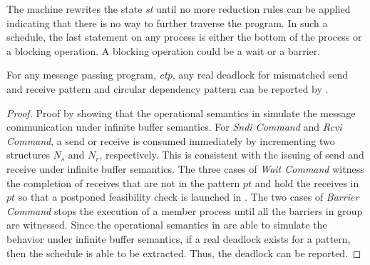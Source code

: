 The machine rewrites the state \textit{st} until no more reduction rules can be applied indicating that there is no way to further traverse the program. In such a schedule, the last statement on any process is either the bottom of the process or a blocking operation. A blocking operation could be a wait or a barrier. 



\begin{lemma}
For any message passing program, \textit{ctp}, any real deadlock for mismatched send and receive pattern and circular dependency pattern can be reported by .
\label{lemma:complete}
\end{lemma}
\begin{proof}
Proof by showing that the operational semantics in  simulate the message communication under infinite buffer semantics. For \emph{Sndi Command} and \emph{Rcvi Command}, a send or receive is consumed immediately by incrementing two structures $\mathit{N_s}$ and $\mathit{N_r}$, respectively. This is consistent with the issuing of send and receive under infinite buffer semantics. The three cases of \emph{Wait Command} witness the completion of receives that are not in the pattern $\mathit{pt}$ and hold the receives in $\mathit{pt}$ so that a postponed feasibility check is launched in . The two cases of \emph{Barrier Command} stops the execution of a member process until all the barriers in group are witnessed. Since the operational semantics in  are able to simulate the behavior under infinite buffer semantics, if a real deadlock exists for a pattern, then the schedule is able to be extracted. Thus, the deadlock can be reported.
\end{proof}

